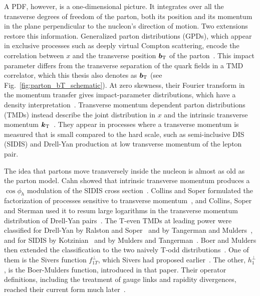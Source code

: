 A PDF, however, is a one-dimensional picture. It integrates over all the transverse degrees of freedom of the parton, both its position and its momentum in the plane perpendicular to the nucleon's direction of motion. Two extensions restore this information. Generalized parton distributions (GPDs), which appear in exclusive processes such as deeply virtual Compton scattering, encode the correlation between $x$ and the transverse position $\boldsymbol{b}_{\mathrm T}$ of the parton~\cite{Muller:1994ses,Radyushkin:1997ki,Ji:1996ek,Diehl:2003ny}. This impact parameter differs from the transverse separation of the quark fields in a TMD correlator, which this thesis also denotes as $\boldsymbol{b}_{\mathrm T}$ (see Fig.~\ref{fig:parton_bT_schematic}). At zero skewness, their Fourier transform in the momentum transfer gives impact-parameter distributions, which have a density interpretation~\cite{Burkardt:2000za}. Transverse momentum dependent parton distributions (TMDs) instead describe the joint distribution in $x$ and the intrinsic transverse momentum $\boldsymbol{k}_{\mathrm T}$~\cite{Collins:1981uw,Mulders:1995dh,CollinsBook2011}. They appear in processes where a transverse momentum is measured that is small compared to the hard scale, such as semi-inclusive DIS (SIDIS) and Drell-Yan production at low transverse momentum of the lepton pair.

The idea that partons move transversely inside the nucleon is almost as old as the parton model. Cahn showed that intrinsic transverse momentum produces a $\cos\phi_h$ modulation of the SIDIS cross section~\cite{Cahn:1978se}. Collins and Soper formulated the factorization of processes sensitive to transverse momentum~\cite{Collins:1981uk,Collins:1981uw}, and Collins, Soper and Sterman used it to resum large logarithms in the transverse momentum distribution of Drell-Yan pairs~\cite{Collins:1984kg}. The T-even TMDs at leading power were classified for Drell-Yan by Ralston and Soper~\cite{Ralston:1979ys} and by Tangerman and Mulders~\cite{Tangerman:1994eh}, and for SIDIS by Kotzinian~\cite{Kotzinian:1994dv} and by Mulders and Tangerman~\cite{Mulders:1995dh}. Boer and Mulders then extended the classification to the two naively T-odd distributions~\cite{Boer:1997nt}. One of them is the Sivers function $f_{1T}^\perp$, which Sivers had proposed earlier~\cite{Sivers:1989cc}. The other, $h_1^\perp$, is the Boer-Mulders function, introduced in that paper. Their operator definitions, including the treatment of gauge links and rapidity divergences, reached their current form much later~\cite{Ji:2004wu,CollinsBook2011,Aybat:2011zv}.

